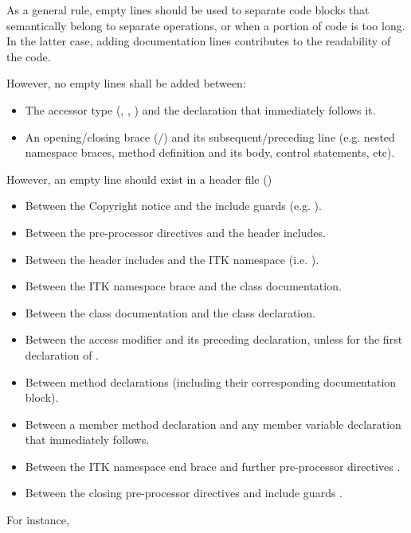 As a general rule, empty lines should be used to separate code blocks that
semantically belong to separate operations, or when a portion of code is
too long. In the latter case, adding documentation lines contributes to the
readability of the code.

However, no empty lines shall be added between:
\begin{itemize}
\item The accessor type (, , ) and
the declaration that immediately follows it.
\item An opening/closing brace (\code{\{}/\code{\}}) and its
subsequent/preceding line (e.g. nested namespace braces, method definition and
its body, control statements, etc).
\end{itemize}

However, an empty line should exist in a header file ()
\begin{itemize}
\item Between the Copyright notice and the include guards (e.g.
).
\item Between the pre-processor directives and the header includes.
\item Between the header includes and the ITK namespace (i.e.
).
\item Between the ITK namespace brace and the class documentation.
\item Between the class documentation and the class declaration.
\item Between the access modifier and its preceding declaration, unless for the
first declaration of .
\item Between method declarations (including their corresponding documentation
block).
\item Between a member method declaration and any member variable declaration
that immediately follows.
\item Between the ITK namespace end brace  and
further pre-processor directives .
\item Between the closing pre-processor directives and include guards .
\end{itemize}

For instance,

